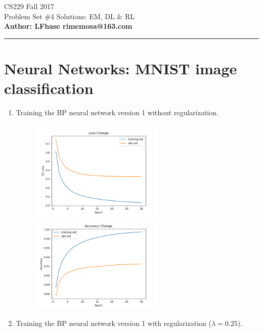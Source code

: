 \documentclass[12pt]{article}
\begin{document}
    \begin{flushleft}
    \LARGE CS229 Fall 2017\\
    \LARGE Problem Set \#4 Solutions:  EM, DL \& RL \\
    \textbf{\normalsize Author: LFhase \quad rimemosa@163.com}
    \end{flushleft} 
    \noindent
    \rule{\linewidth}{0.4pt}

    \section*{Neural Networks: MNIST image classification}
    \begin{enumerate}[label=(\alph*)]
        \item Training the BP neural network version 1 without regularization.
        \begin{figure}[h]
            \begin{minipage}[h]{0.5\linewidth}
                \centering
                \includegraphics[width=2.5in]{Q1/loss_v1.png}
            \end{minipage}%
            \begin{minipage}[h]{0.5\linewidth}
                \centering
                \includegraphics[width=2.5in]{Q1/acc_v1.png}
            \end{minipage}
        \end{figure}
        \item Training the BP neural network version 1 with regularization ($\lambda = 0.25$).

\end{enumerate}
\end{document}
